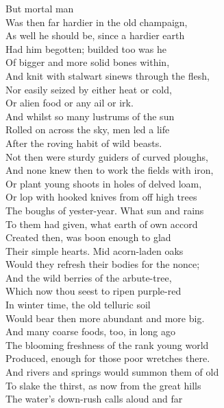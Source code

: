 
But mortal man\\
Was then far hardier in the old champaign,\\
As well he should be, since a hardier earth\\
Had him begotten; builded too was he\\
Of bigger and more solid bones within,\\
And knit with stalwart sinews through the flesh,\\
Nor easily seized by either heat or cold,\\
Or alien food or any ail or irk.\\
And whilst so many lustrums of the sun\\
Rolled on across the sky, men led a life\\
After the roving habit of wild beasts.\\
Not then were sturdy guiders of curved ploughs,\\
And none knew then to work the fields with iron,\\
Or plant young shoots in holes of delved loam,\\
Or lop with hooked knives from off high trees\\
The boughs of yester-year. What sun and rains\\
To them had given, what earth of own accord\\
Created then, was boon enough to glad\\
Their simple hearts. Mid acorn-laden oaks\\
Would they refresh their bodies for the nonce;\\
And the wild berries of the arbute-tree,\\
Which now thou seest to ripen purple-red\\
In winter time, the old telluric soil\\
Would bear then more abundant and more big.\\
And many coarse foods, too, in long ago\\
The blooming freshness of the rank young world\\
Produced, enough for those poor wretches there.\\
And rivers and springs would summon them of old\\
To slake the thirst, as now from the great hills\\
The water's down-rush calls aloud and far\\
